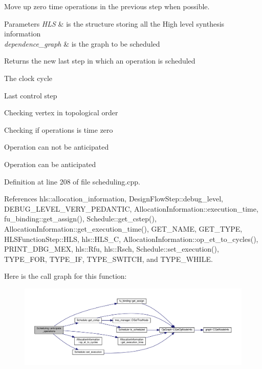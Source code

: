 Move up zero time operations in the previous step when possible. 


\begin{DoxyParams}{Parameters}
{\em H\+LS} & is the structure storing all the High level synthesis information \\
\hline
{\em dependence\+\_\+graph} & is the graph to be scheduled \\
\hline
\end{DoxyParams}
\begin{DoxyReturn}{Returns}
the new last step in which an operation is scheduled 
\end{DoxyReturn}
The clock cycle

Last control step

Checking vertex in topological order

Checking if operations is time zero

Operation can not be anticipated

Operation can be anticipated 

Definition at line 208 of file scheduling.\+cpp.



References hls\+::allocation\+\_\+information, Design\+Flow\+Step\+::debug\+\_\+level, D\+E\+B\+U\+G\+\_\+\+L\+E\+V\+E\+L\+\_\+\+V\+E\+R\+Y\+\_\+\+P\+E\+D\+A\+N\+T\+IC, Allocation\+Information\+::execution\+\_\+time, fu\+\_\+binding\+::get\+\_\+assign(), Schedule\+::get\+\_\+cstep(), Allocation\+Information\+::get\+\_\+execution\+\_\+time(), G\+E\+T\+\_\+\+N\+A\+ME, G\+E\+T\+\_\+\+T\+Y\+PE, H\+L\+S\+Function\+Step\+::\+H\+LS, hls\+::\+H\+L\+S\+\_\+C, Allocation\+Information\+::op\+\_\+et\+\_\+to\+\_\+cycles(), P\+R\+I\+N\+T\+\_\+\+D\+B\+G\+\_\+\+M\+EX, hls\+::\+Rfu, hls\+::\+Rsch, Schedule\+::set\+\_\+execution(), T\+Y\+P\+E\+\_\+\+F\+OR, T\+Y\+P\+E\+\_\+\+IF, T\+Y\+P\+E\+\_\+\+S\+W\+I\+T\+CH, and T\+Y\+P\+E\+\_\+\+W\+H\+I\+LE.

Here is the call graph for this function\+:
\nopagebreak
\begin{figure}[H]
\begin{center}
\leavevmode
\includegraphics[width=350pt]{db/d2c/classScheduling_acbaf1ca26611af23e5ebcfc21b2ea105_cgraph}
\end{center}
\end{figure}
\mbox{\label{classScheduling_a785e18cb44b1a3daff11da1ea6b72fb6}} 
